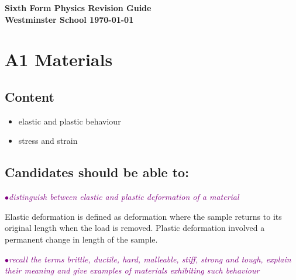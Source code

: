\documentclass[a4paper,11pt,twoside]{memoir}
\newcommand{\theversion}{}
\newcounter{spec}[chapter]
\newcommand{\spec}[1]{\Needspace{5\baselineskip}\textcolor{purple}{$\bullet$\hspace{0.5cm}\textit{#1}}}
\begin{document}
\raggedbottom
\frontmatter
\small\forkme[east]
\begin{titlingpage}

\vspace*{\fill}
    \begin{center}\Huge\bfseries Sixth Form Physics Revision Guide \\ \vspace{3cm} \Large Westminster School
    \vfill \today \\ \theversion \end{center} 
	\thispagestyle{empty}
\end{titlingpage}

\tableofcontents

\mainmatter
\chapter{A1 Materials}
\setcounter{spec}{0}
\section*{Content}
\begin{itemize}
\item elastic and plastic behaviour
\item stress and strain
\end{itemize}

\section*{Candidates should be able to:}
\spec{distinguish between elastic and plastic deformation of a material}

Elastic deformation is defined as deformation where the sample returns to its original length when the load is removed. Plastic deformation involved a permanent change in length of the sample.

\spec{recall the terms brittle, ductile, hard, malleable, stiff, strong and tough, explain their meaning and give examples of materials exhibiting such behaviour}
\end{document}
